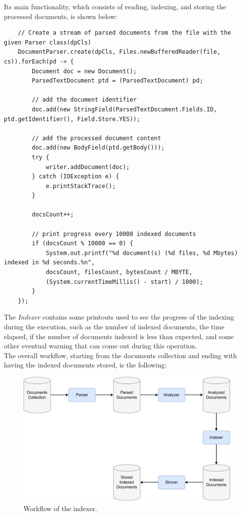 Its main functionality, which consists of reading, indexing, and storing the processed documents, is shown below:
\begin{lstlisting}
    // Create a stream of parsed documents from the file with the given Parser class(dpCls)
    DocumentParser.create(dpCls, Files.newBufferedReader(file, cs)).forEach(pd -> {
        Document doc = new Document();
        ParsedTextDocument ptd = (ParsedTextDocument) pd;

        // add the document identifier
        doc.add(new StringField(ParsedTextDocument.Fields.ID, ptd.getIdentifier(), Field.Store.YES));

        // add the processed document content
        doc.add(new BodyField(ptd.getBody()));
        try {
            writer.addDocument(doc);
        } catch (IOException e) {
            e.printStackTrace();
        }

        docsCount++;

        // print progress every 10000 indexed documents
        if (docsCount % 10000 == 0) {
            System.out.printf("%d document(s) (%d files, %d Mbytes) indexed in %d seconds.%n",
            docsCount, filesCount, bytesCount / MBYTE,
            (System.currentTimeMillis() - start) / 1000);
        }
    });
\end{lstlisting}

The \textit{Indexer} contains some printouts used to see the progress of the indexing during the execution, such as the number of indexed documents, the time elapsed, if the number of documents indexed is less than expected, and some other eventual warning that can come out during this operation. \\
The overall workflow, starting from the documents collection and ending with having the indexed documents stored, is the following:
\begin{figure}[!h]
    \centering
    \includegraphics[width=0.8\linewidth]{figure/Indexer_workflow.pdf}
    \caption{Workflow of the indexer.}
    \label{fig:Indexer_workflow}
\end{figure}


